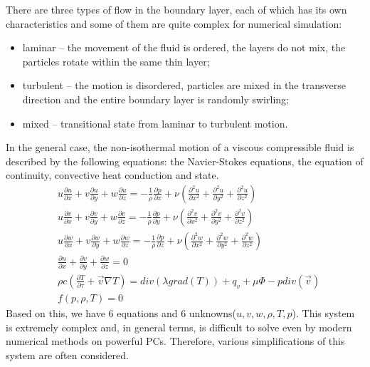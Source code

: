 	There are three types of flow in the boundary layer, each of which has its own characteristics and some of them are quite complex for numerical simulation:
	\begin{itemize}
		\item laminar -- the movement of the fluid is ordered, the layers do not mix, the particles rotate within the same thin layer;
		\item turbulent -- the motion is disordered, particles are mixed in the transverse direction and the entire boundary layer is randomly swirling;
		\item mixed -- transitional state from laminar to turbulent motion.
	\end{itemize}

	In the general case, the non-isothermal motion of a viscous compressible fluid is described by the following equations: the Navier-Stokes equations, the equation of continuity, convective heat conduction and state.
	\begin{align}
		& u\frac{\partial u}{\partial x} + v\frac{\partial u}{\partial y} + w\frac{\partial u}{\partial z} = -\frac{1}{\rho}\frac{\partial p}{\partial x} + \nu(\frac{\partial^2 u}{\partial x^2} + \frac{\partial^2 u}{\partial y^2} + \frac{\partial^2 u}{\partial z^2}) \nonumber\\
		& u\frac{\partial v}{\partial x} + v\frac{\partial v}{\partial y} + w\frac{\partial v}{\partial z} = -\frac{1}{\rho}\frac{\partial p}{\partial y} + \nu(\frac{\partial^2 v}{\partial x^2} + \frac{\partial^2 v}{\partial y^2} + \frac{\partial^2 v}{\partial z^2})\nonumber\\
		& u\frac{\partial w}{\partial x} + v\frac{\partial w}{\partial y} + w\frac{\partial w}{\partial z} = -\frac{1}{\rho}\frac{\partial p}{\partial z} + \nu(\frac{\partial^2 w}{\partial x^2} + \frac{\partial^2 w}{\partial y^2} + \frac{\partial^2 w}{\partial z^2})\nonumber\\
		& \frac{\partial u}{\partial x} + \frac{\partial v}{\partial y} + \frac{\partial w}{\partial z} = 0 \nonumber\\
		& \rho c (\frac{\partial T}{\partial\tau} + \vec{v}\nabla T) = div(\lambda grad(T)) + q_v + \mu\Phi - p div(\vec{v}) \nonumber\\
		& f(p, \rho, T) = 0
	\end{align}
	Based on this, we have 6 equations and 6 unknowns($u, v, w, \rho, T, p$). This system is extremely complex and, in general terms, is difficult to solve even by modern numerical methods on powerful PCs. Therefore, various simplifications of this system are often considered.


